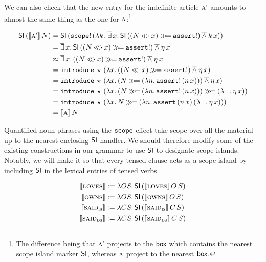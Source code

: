 We can also check that the new entry for the indefinite article $\textsc{a'}$
amounts to almost the same thing as the one for $\textsc{a}$:\footnote{The
  difference being that $\textsc{a'}$ projects to the $\textsf{box}$ which contains
  the nearest scope island marker $\textsf{SI}$, whereas $\textsc{a}$ project to the
  nearest $\textsf{box}$.}

\begin{align*}
\ap{\SI}{(\ap{\sem{\abs{a'}}}{N})}
&= \ap{\SI}{(\ap{\op{scope}!}{(\lam{k}{\dexists x.\,\ap{\SI}{((N \apl x) \hsbind \op{assert}!)} \dand \ap{k}{x}})})} \\
&= \dexists x.\,\ap{\SI}{((N \apl x) \hsbind \op{assert}!)} \dand \etaE{x} \\
&\approx \dexists x.\,((N \apl x) \hsbind \op{assert}!) \dand \etaE{x} \\
&= \app{\op{introduce}}{\star}{(\lam{x}{((N \apl x) \hsbind \op{assert}!) \dand \etaE{x}})} \\
&= \app{\op{introduce}}{\star}{(\lam{x}{(N \hsbind (\lam{n}{\ap{\op{assert}!}{(\ap{n}{x})}})) \dand \etaE{x}})} \\
&= \app{\op{introduce}}{\star}{(\lam{x}{(N \hsbind (\lam{n}{\ap{\op{assert}!}{(\ap{n}{x})}})) \hsbind (\lam{\_}{\etaE{x}})})} \\
&= \app{\op{introduce}}{\star}{(\lam{x}{N \hsbind (\lam{n}{\app{\op{assert}}{(\ap{n}{x})}{(\lam{\_}{\etaE{x}})}})})} \\
&= \ap{\sem{\abs{a}}}{N}
\end{align*}

Quantified noun phrases using the $\mathtt{scope}$ effect take scope over
all the material up to the nearest enclosing $\textsf{SI}$ handler. We should
therefore modify some of the existing constructions in our grammar to use
$\textsf{SI}$ to designate scope islands. Notably, we will make it so that every
tensed clause acts as a scope island by including $\textsf{SI}$ in the lexical
entries of tensed verbs.

\begin{align*}
  \llbracket \textsc{loves} \rrbracket &:= \lambda O S.\, \textsf{SI}\,(\llbracket \textsc{loves} \rrbracket\,O\,S) \\
  \llbracket \textsc{owns} \rrbracket &:= \lambda O S.\, \textsf{SI}\,(\llbracket \textsc{owns} \rrbracket\,O\,S) \\
  \llbracket \textsc{said}_{\textsc{is}} \rrbracket &:= \lambda C S.\, \textsf{SI}\,(\llbracket \textsc{said}_{\textsc{is}} \rrbracket\,C\,S) \\
  \llbracket \textsc{said}_{\textsc{ds}} \rrbracket &:= \lambda C S.\, \textsf{SI}\,(\llbracket \textsc{said}_{\textsc{ds}} \rrbracket\,C\,S)
\end{align*}


